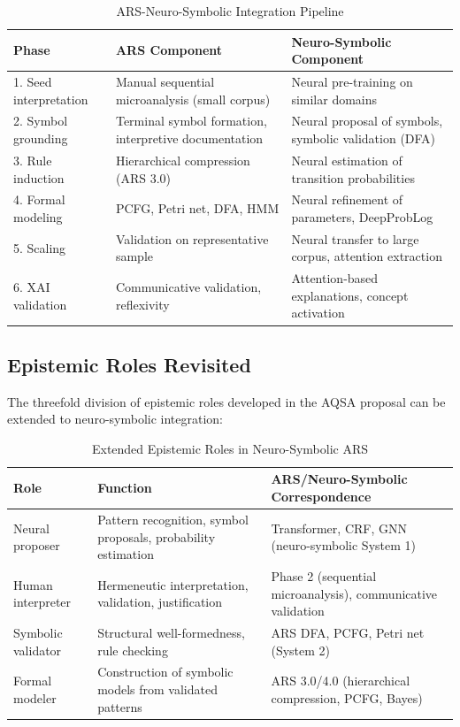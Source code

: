 \documentclass[12pt,a4paper]{article}
\begin{document}
\begin{table}[H]
\centering
\caption{ARS-Neuro-Symbolic Integration Pipeline}
\label{tab:pipeline}
\begin{tabular}{@{} p{3cm} p{4cm} p{4cm} @{}}
\toprule
\textbf{Phase} & \textbf{ARS Component} & \textbf{Neuro-Symbolic Component} \\
\midrule
1. Seed interpretation & Manual sequential microanalysis (small corpus) & Neural pre-training on similar domains \\
2. Symbol grounding & Terminal symbol formation, interpretive documentation & Neural proposal of symbols, symbolic validation (DFA) \\
3. Rule induction & Hierarchical compression (ARS 3.0) & Neural estimation of transition probabilities \\
4. Formal modeling & PCFG, Petri net, DFA, HMM & Neural refinement of parameters, DeepProbLog \\
5. Scaling & Validation on representative sample & Neural transfer to large corpus, attention extraction \\
6. XAI validation & Communicative validation, reflexivity & Attention-based explanations, concept activation \\
\bottomrule
\end{tabular}
\end{table}

\subsection{Epistemic Roles Revisited}

The threefold division of epistemic roles developed in the AQSA proposal 
\citep{koop2026aqsa} can be extended to neuro-symbolic integration:

\begin{table}[H]
\centering
\caption{Extended Epistemic Roles in Neuro-Symbolic ARS}
\label{tab:roles}
\begin{tabular}{@{} p{3cm} p{4cm} p{4cm} @{}}
\toprule
\textbf{Role} & \textbf{Function} & \textbf{ARS/Neuro-Symbolic Correspondence} \\
\midrule
Neural proposer & Pattern recognition, symbol proposals, probability estimation & Transformer, CRF, GNN (neuro-symbolic System 1) \\
Human interpreter & Hermeneutic interpretation, validation, justification & Phase 2 (sequential microanalysis), communicative validation \\
Symbolic validator & Structural well-formedness, rule checking & ARS DFA, PCFG, Petri net (System 2) \\
Formal modeler & Construction of symbolic models from validated patterns & ARS 3.0/4.0 (hierarchical compression, PCFG, Bayes) \\
\bottomrule
\end{tabular}
\end{table}
\end{document}
